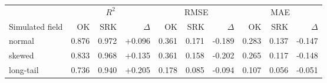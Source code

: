 \begin{tabular}{lrrrrrrrrr}
\hline
& \multicolumn{3}{c}{$R^2$} & \multicolumn{3}{c}{RMSE} & \multicolumn{3}{c}{MAE} \\
Simulated field & OK & SRK & $\Delta$ & OK & SRK & $\Delta$ & OK & SRK & $\Delta$ \\
\hline
normal & 0.876 & 0.972 & +0.096 & 0.361 & 0.171 & -0.189 & 0.283 & 0.137 & -0.147 \\
skewed & 0.833 & 0.968 & +0.135 & 0.361 & 0.158 & -0.202 & 0.265 & 0.117 & -0.148 \\
long-tail & 0.736 & 0.940 & +0.205 & 0.178 & 0.085 & -0.094 & 0.107 & 0.056 & -0.051 \\
\hline
\end{tabular}
